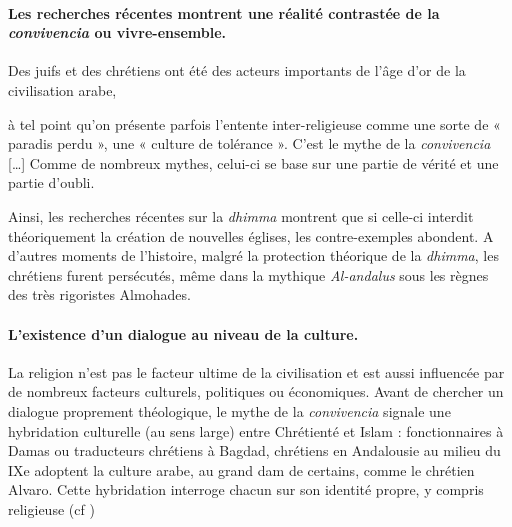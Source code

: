 \paragraph{Les recherches récentes montrent une réalité contrastée de la \textit{convivencia} ou vivre-ensemble.} 
\begin{comment}
    Or, avec l'émergence de l'empire Abbasside, l'Islam se  fragmente avec trois califes à Cordoue, au Caire ou à Bagdad dans ce qui est pourtant considéré comme l'âge d'or de l'Islam.
\end{comment} 
Des juifs et des chrétiens ont été des acteurs importants de l'âge d'or de la civilisation arabe,
\begin{singlequote}
  [\ldots] à tel point qu'on présente parfois l'entente inter-religieuse  comme une sorte de « paradis perdu », une « culture de tolérance ». C'est le mythe de la \textit{convivencia} [\ldots] Comme de nombreux mythes, celui-ci se base sur une partie de vérité et une partie d'oubli.  \cite[p. 102]{tolan_nouvelle_2022}
\end{singlequote}
Ainsi, les recherches récentes sur la \textit{dhimma} montrent que si celle-ci interdit théoriquement la création de nouvelles églises, les contre-exemples abondent. 
A d'autres moments de l'histoire, malgré la protection théorique de la \textit{dhimma}, les chrétiens furent persécutés, même dans la mythique \textit{Al-andalus} sous les règnes des très rigoristes Almohades.

\paragraph{L'existence d'un dialogue au niveau de la culture.} La religion n'est pas le facteur ultime de la civilisation et est aussi influencée par de nombreux facteurs culturels, politiques ou économiques\cite[p. 40]{brague_sur_2023}. Avant de chercher un dialogue proprement théologique, le mythe de la \textit{convivencia} signale une hybridation culturelle (au sens large)  entre Chrétienté et Islam  : fonctionnaires à Damas ou traducteurs chrétiens à Bagdad, chrétiens en Andalousie au milieu du IXe adoptent la culture arabe, au grand dam de certains, comme le chrétien Alvaro.   Cette hybridation interroge chacun sur son identité propre, y compris religieuse (cf \cite[p. 84]{brague_sur_2023})



